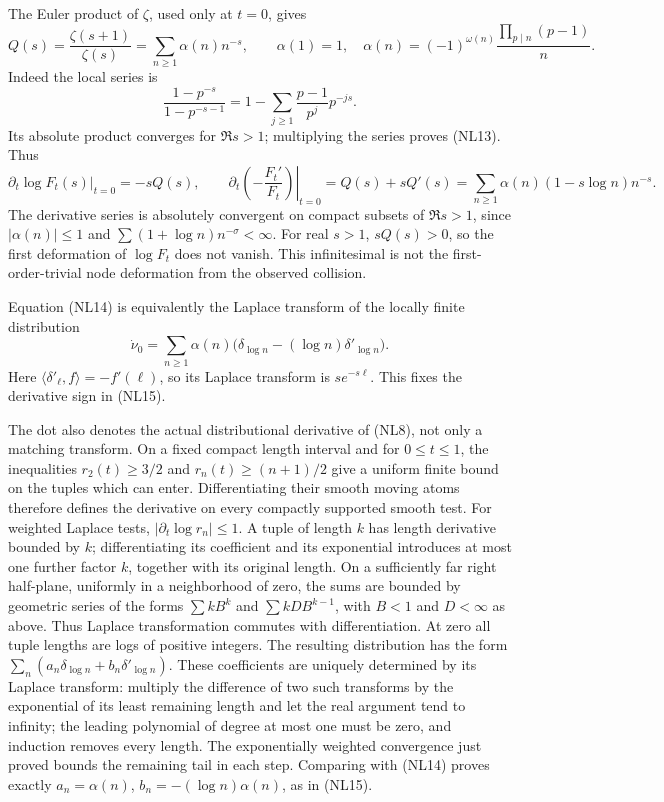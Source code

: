 \documentclass[
  10pt,
  a4paper,
]{article}
\begin{document}
The Euler product of \(\zeta\), used only at \(t=0\), gives \[
Q(s)=\frac{\zeta(s+1)}{\zeta(s)}
=\sum_{n\ge1}\alpha(n)n^{-s},\qquad
\alpha(1)=1,\quad
\alpha(n)=(-1)^{\omega(n)}\frac{\prod_{p\mid n}(p-1)}{n}.
\tag{NL13}
\] Indeed the local series is \[
\frac{1-p^{-s}}{1-p^{-s-1}}
=1-\sum_{j\ge1}\frac{p-1}{p^j}p^{-js}.
\] Its absolute product converges for \(\Re s>1\); multiplying the
series proves (NL13). Thus \[
\left.\partial_t\log F_t(s)\right|_{t=0}=-sQ(s),
\qquad
\left.\partial_t\left(-\frac{F_t'}{F_t}\right)\right|_{t=0}
=Q(s)+sQ'(s)
=\sum_{n\ge1}\alpha(n)(1-s\log n)n^{-s}.
\tag{NL14}
\] The derivative series is absolutely convergent on compact subsets of
\(\Re s>1\), since \(|\alpha(n)|\le1\) and
\(\sum(1+\log n)n^{-\sigma}<\infty\). For real \(s>1\), \(sQ(s)>0\), so
the first deformation of \(\log F_t\) does not vanish. This
infinitesimal is not the first-order-trivial node deformation from the
observed collision.

Equation (NL14) is equivalently the Laplace transform of the locally
finite distribution \[
\dot\nu_0=
\sum_{n\ge1}\alpha(n)
\bigl(\delta_{\log n}-(\log n)\delta'_{\log n}\bigr).
\tag{NL15}
\] Here \(\langle\delta'_\ell,f\rangle=-f'(\ell)\), so its Laplace
transform is \(s e^{-s\ell}\). This fixes the derivative sign in (NL15).

The dot also denotes the actual distributional derivative of (NL8), not
only a matching transform. On a fixed compact length interval and for
\(0\le t\le1\), the inequalities \(r_2(t)\ge3/2\) and
\(r_n(t)\ge(n+1)/2\) give a uniform finite bound on the tuples which can
enter. Differentiating their smooth moving atoms therefore defines the
derivative on every compactly supported smooth test. For weighted
Laplace tests, \(|\partial_t\log r_n|\le1\). A tuple of length \(k\) has
length derivative bounded by \(k\); differentiating its coefficient and
its exponential introduces at most one further factor \(k\), together
with its original length. On a sufficiently far right half-plane,
uniformly in a neighborhood of zero, the sums are bounded by geometric
series of the forms \(\sum k B^k\) and \(\sum k D B^{k-1}\), with
\(B<1\) and \(D<\infty\) as above. Thus Laplace transformation commutes
with differentiation. At zero all tuple lengths are logs of positive
integers. The resulting distribution has the form
\(\sum_n(a_n\delta_{\log n}+b_n\delta'_{\log n})\). These coefficients
are uniquely determined by its Laplace transform: multiply the
difference of two such transforms by the exponential of its least
remaining length and let the real argument tend to infinity; the leading
polynomial of degree at most one must be zero, and induction removes
every length. The exponentially weighted convergence just proved bounds
the remaining tail in each step. Comparing with (NL14) proves exactly
\(a_n=\alpha(n)\), \(b_n=-(\log n)\alpha(n)\), as in (NL15).
\end{document}
